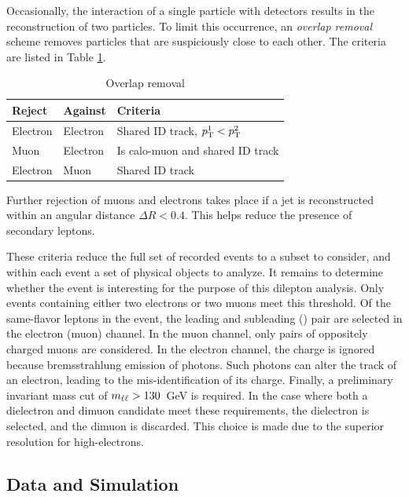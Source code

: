 Occasionally, the interaction of a single particle with detectors results in the reconstruction of two particles.
To limit this occurrence, an \emph{overlap removal} scheme removes particles that are suspiciously close to each other.
The criteria are listed in Table \ref{tab:ciOr}.
\begin{table}[ht]
\caption{Overlap removal}
\begin{center}
    \begin{tabular}[ht]{l l l}
    \toprule
    Reject & Against & Criteria \\
    \midrule
    Electron & Electron & Shared ID track, $p_\text{T}^1<p_\text{T}^2$ \\
    Muon     & Electron & Is calo-muon and shared ID track \\
    Electron & Muon     & Shared ID track \\
    \bottomrule
    \end{tabular}
\end{center}
\label{tab:ciOr}
\end{table}
Further rejection of muons and electrons takes place if a jet is reconstructed within an angular distance $\Delta R<0.4$.
This helps reduce the presence of secondary leptons.

These criteria reduce the full set of recorded events to a subset to consider, and within each event a set of physical objects to analyze.
It remains to determine whether the event is interesting for the purpose of this dilepton analysis.
Only events containing either two electrons or two muons meet this threshold.
Of the same-flavor leptons in the event, the leading and subleading \et (\pt) pair are selected in the electron (muon) channel.
In the muon channel, only pairs of oppositely charged muons are considered. 
In the electron channel, the charge is ignored because bremsstrahlung emission of photons.
Such photons can alter the track of an electron, leading to the mis-identification of its charge.
Finally, a preliminary invariant mass cut of $m_{\ell\ell}>130$~GeV is required.
In the case where both a dielectron and dimuon candidate meet these requirements, the dielectron is selected, and the dimuon is discarded.
This choice is made due to the superior resolution for high-\et electrons.

\subsection{Data and Simulation}

